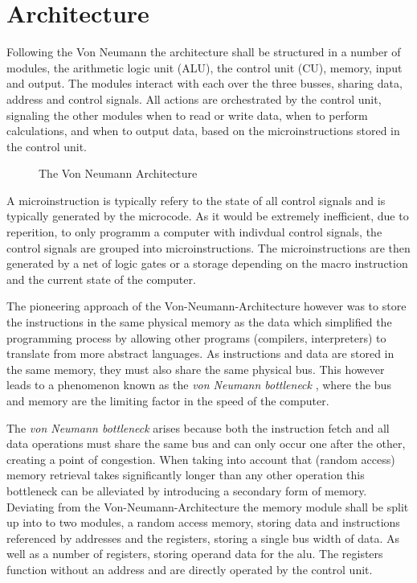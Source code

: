 \section{Architecture}

Following the Von Neumann the architecture shall be structured in a number of modules, the arithmetic logic unit (ALU), the control unit (CU), memory, input and output. The modules interact with each over the three busses, sharing data, address and control signals. All actions are orchestrated by the control unit, signaling the other modules when to read or write data, when to perform calculations, and when to output data, based on the microinstructions stored in the control unit.

\begin{figure}[H]
  \begin{center}
    
  \end{center}
  \caption{The Von Neumann Architecture \cite{fig-vna}}\label{fig:vna}
\end{figure}

A microinstruction is typically refery to the state of all control signals and is typically generated by the microcode. As it would be extremely inefficient, due to reperition, to only programm a computer with indivdual control signals, the control signals are grouped into microinstructions. The microinstructions are then generated by a net of logic gates or a storage depending on the macro instruction and the current state of the computer.

The pioneering approach of the Von-Neumann-Architecture however was to store the instructions in the same physical memory as the data which simplified the programming process by allowing other programs (compilers, interpreters) to translate from more abstract languages. As instructions and data are stored in the same memory, they must also share the same physical bus. This however leads  to a phenomenon known as the \textit{von Neumann bottleneck} \cite{cit.needed}, where the bus and memory are the limiting factor in the speed of the computer. 

The \textit{von Neumann bottleneck} arises because both the instruction fetch and all data operations must share the same bus and can only occur one after the other, creating a point of congestion. When taking into account that (random access) memory retrieval takes significantly longer than any other operation this bottleneck can be alleviated by introducing a secondary form of memory. Deviating from the Von-Neumann-Architecture the memory module shall be split up into to two modules, a random access memory, storing data and instructions referenced by addresses and the registers, storing a single bus width of data. As well as a number of registers, storing operand data for the alu. The registers function without an address and are directly operated by the control unit.

